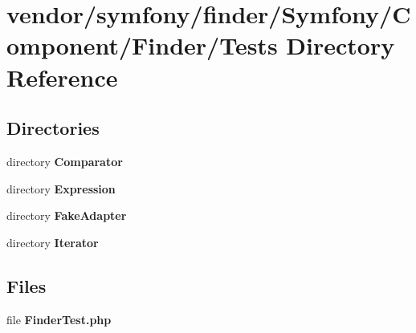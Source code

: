 \section{vendor/symfony/finder/\+Symfony/\+Component/\+Finder/\+Tests Directory Reference}
\label{dir_ea13cc86e4f8d2482f6aad60a8830460}
\subsection*{Directories}
\begin{DoxyCompactItemize}
\item 
directory {\bf Comparator}
\item 
directory {\bf Expression}
\item 
directory {\bf Fake\+Adapter}
\item 
directory {\bf Iterator}
\end{DoxyCompactItemize}
\subsection*{Files}
\begin{DoxyCompactItemize}
\item 
file {\bf Finder\+Test.\+php}
\end{DoxyCompactItemize}
